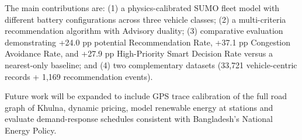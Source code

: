 \documentclass[conference]{IEEEtran}
\begin{document}
The main contributions are: (1) a physics-calibrated SUMO fleet model
with different battery configurations across three vehicle classes;
(2) a multi-criteria recommendation algorithm with Advisory duality;
(3) comparative evaluation demonstrating +24.0 pp potential
Recommendation Rate, +37.1 pp Congestion Avoidance Rate, and +27.9 pp
High-Priority Smart Decision Rate versus a nearest-only baseline; and
(4) two complementary datasets (33,721 vehicle-centric records +
1,169 recommendation events).

Future work will be expanded to include GPS trace calibration of the
full road graph of Khulna, dynamic pricing, model renewable energy at
stations and evaluate demand-response schedules consistent with
Bangladesh's National Energy Policy.

\footnotesize
\end{document}
